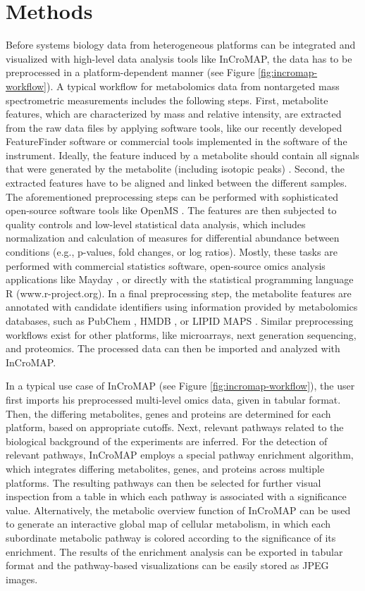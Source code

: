\documentclass[final,5p,times,twocolumn]{elsarticle}
\newcommand\red[1]{{\color{red}#1}}
\begin{document}
\section{Methods}
Before systems biology data from heterogeneous platforms can be integrated and visualized with high-level data analysis tools like InCroMAP, the data has to be preprocessed in a platform-dependent manner (see Figure \ref{fig:incromap-workflow}). A typical workflow for metabolomics data from nontargeted mass spectrometric measurements includes the following steps. First, metabolite features, which are characterized by mass and relative intensity, are extracted from the raw data files by applying software tools, like our recently developed FeatureFinder software \cite{Kenar2014} or commercial tools implemented in the software of the instrument. Ideally, the feature induced by a metabolite should contain all signals that were generated by the metabolite (including isotopic peaks) \cite{Kenar2014}. Second, the extracted features have to be aligned and linked between the different samples. The aforementioned preprocessing steps can be performed with sophisticated open-source software tools like OpenMS \cite{
Sturm2008}. The features are then subjected to quality controls and low-level statistical data analysis, which includes normalization and calculation of measures for differential abundance between conditions (e.g., p-values, fold changes, or log ratios). Mostly, these tasks are performed with commercial statistics software, open-source omics analysis applications like Mayday \cite{Battke2010}, or directly with the statistical programming language R (www.r-project.org). In a final preprocessing step, the metabolite features are annotated with candidate identifiers using information provided by metabolomics databases, such as PubChem \cite{Wang2009}, HMDB \cite{Wishart2009}, or LIPID MAPS \cite{Sud2007}. Similar preprocessing workflows exist for other platforms, like microarrays, next generation sequencing, and proteomics. The processed data can then be imported and analyzed with InCroMAP.

In a typical use case of InCroMAP (see Figure \ref{fig:incromap-workflow}), the user first imports his preprocessed multi-level omics data, given in tabular format. Then, the \red{differing metabolites, genes and proteins} are determined for each platform, based on appropriate cutoffs. Next, relevant pathways related to the biological background of the experiments are inferred. For the detection of relevant pathways, InCroMAP employs a special pathway enrichment algorithm, which integrates \red{differing metabolites, genes, and proteins} across multiple platforms. The resulting pathways can then be selected for further visual inspection from a table in which each pathway is associated with a significance value. Alternatively, the metabolic overview function of InCroMAP can be used to generate an interactive global map of cellular metabolism, in which each subordinate metabolic pathway is colored according to the significance of its enrichment. The results of the enrichment analysis can be 
exported in tabular format and the pathway-based visualizations can be easily stored as JPEG images.
\end{document}
